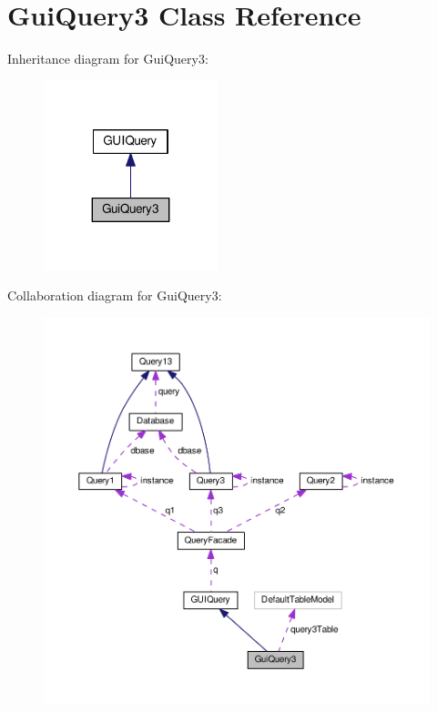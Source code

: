\hypertarget{classGuiQuery3}{}\section{Gui\+Query3 Class Reference}
\label{classGuiQuery3}


Inheritance diagram for Gui\+Query3\+:\nopagebreak
\begin{figure}[H]
\begin{center}
\leavevmode
\includegraphics[width=143pt]{classGuiQuery3__inherit__graph}
\end{center}
\end{figure}


Collaboration diagram for Gui\+Query3\+:\nopagebreak
\begin{figure}[H]
\begin{center}
\leavevmode
\includegraphics[width=350pt]{classGuiQuery3__coll__graph}
\end{center}
\end{figure}
